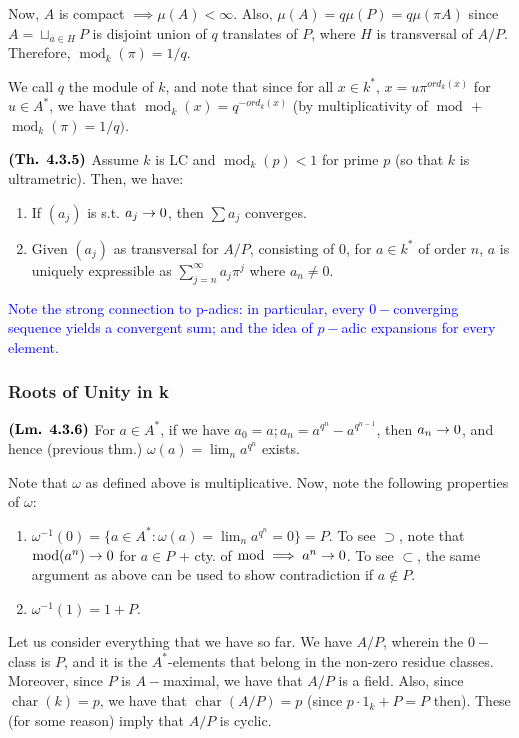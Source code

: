 \documentclass{article}
\DeclareMathOperator{\modl}{mod}
\DeclareMathOperator{\chars}{char}
\begin{document}
Now, $A$ is compact $\implies \mu(A) < \infty$. Also, $\mu(A) = q\mu(P) = q\mu(\pi A)$ since $A = \sqcup_{a \in H}P$ is disjoint union of $q$ translates of $P$, where $H$ is transversal of $A/P$. Therefore, $\modl_k(\pi) = 1/q$. 

We call $q$ the module of $k$, and note that since for all $x \in k^*$, $x = u\pi^{ord_k(x)}$ for $u \in A^*$, we have that $\modl_k(x) = q^{-ord_k(x)}$ (by multiplicativity of $\modl$ + $\modl_k(\pi) = 1/q)$.

$\textbf{(Th. 4.3.5)}$ Assume $k$ is LC and $\modl_k(p) < 1$ for prime $p$ (so that $k$ is ultrametric). Then, we have:

\begin{enumerate}
    \item If $(a_j)$ is s.t. $a_j \rightarrow 0$, then $\sum a_j$ converges.
    \item Given $(a_j)$ as transversal for $A/P$, consisting of $0$, for $a \in k^*$ of order $n$, $a$ is uniquely expressible as $\sum_{j=n}^{\infty} a_j\pi^j$ where $a_n \ne 0$.
\end{enumerate}

\textcolor{blue}{Note the strong connection to p-adics: in particular, every $0-$converging sequence yields a convergent sum; and the idea of $p-$adic expansions for every element.}

\subsubsection{Roots of Unity in k}
$\textbf{(Lm. 4.3.6)}$ For $a \in A^*$, if we have $a_0 = a; a_n = a^{q^n} - a^{q^{n-1}}$, then $a_n \rightarrow 0$, and hence (previous thm.) $\omega(a) = \lim_n a^{q^n}$ exists.

Note that $\omega$ as defined above is multiplicative. Now, note the following properties of $\omega$:

\begin{enumerate}
    \item $\omega^{-1}(0) = \{a \in A^*: \omega(a) = \lim_n a^{q^n} = 0 \} = P$. To see $\supset$, note that $\modl(a^n) \ra 0$ for $a \in P$ + cty. of $\modl \implies a^n \ra 0$. To see $\subset$, the same argument as above can be used to show contradiction if $a \notin P$.
    \item $\omega^{-1}(1) = 1 + P$. 
\end{enumerate}

Let us consider everything that we have so far. We have $A/P$, wherein the $0-$class is $P$, and it is the $A^*$-elements that belong in the non-zero residue classes. Moreover, since $P$ is $A-$maximal, we have that $A/P$ is a field. Also, since $\chars(k)=p$, we have that $\chars(A/P) = p$ (since $p\cdot 1_k + P = P$ then). These (for some reason) imply that $A/P$ is cyclic.
\end{document}
